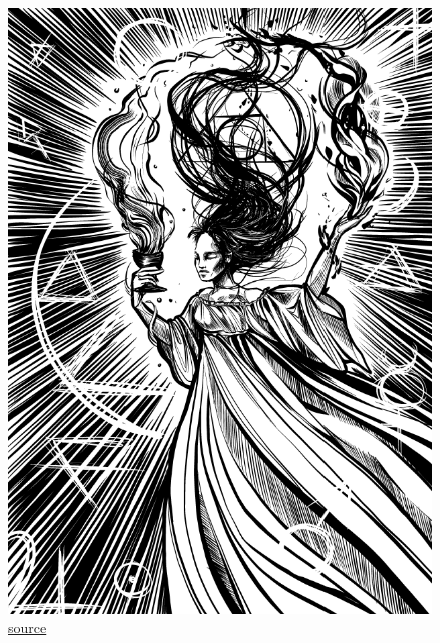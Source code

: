\documentclass[12pt,a4paper,twoside,openany]{book}
\begin{document}


\begin{figure}[h!]
  \centering
  \caption{\href{https://petrakubaskova.cz/wp-content/uploads/2024/07/elixir-cze.png}{source}}
  \includegraphics[width=\textwidth]{carodejka}
\end{figure}



\end{document}
